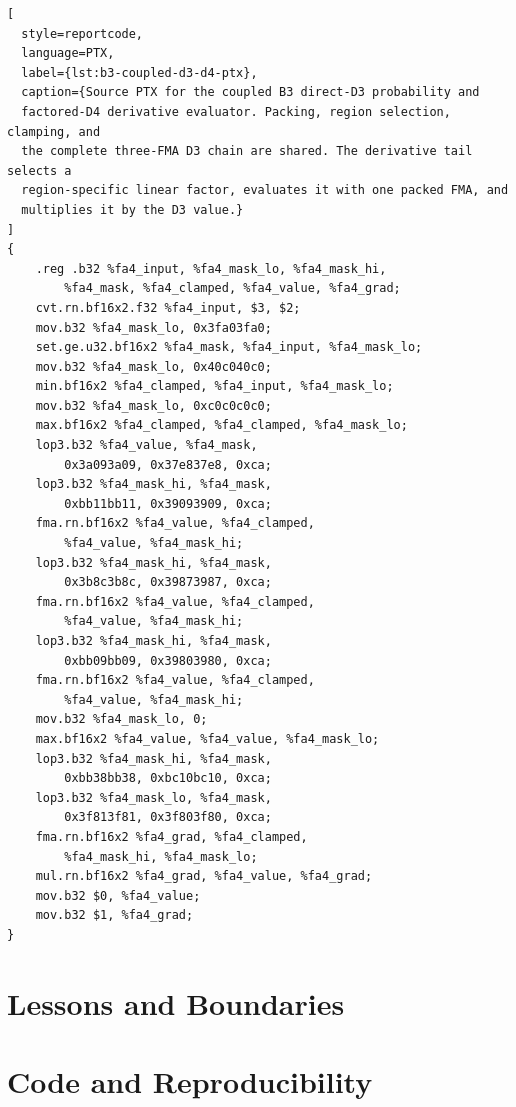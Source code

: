 \documentclass[11pt]{article}
\begin{document}
\begin{lstlisting}[
  style=reportcode,
  language=PTX,
  label={lst:b3-coupled-d3-d4-ptx},
  caption={Source PTX for the coupled B3 direct-D3 probability and
  factored-D4 derivative evaluator. Packing, region selection, clamping, and
  the complete three-FMA D3 chain are shared. The derivative tail selects a
  region-specific linear factor, evaluates it with one packed FMA, and
  multiplies it by the D3 value.}
]
{
    .reg .b32 %fa4_input, %fa4_mask_lo, %fa4_mask_hi,
        %fa4_mask, %fa4_clamped, %fa4_value, %fa4_grad;
    cvt.rn.bf16x2.f32 %fa4_input, $3, $2;
    mov.b32 %fa4_mask_lo, 0x3fa03fa0;
    set.ge.u32.bf16x2 %fa4_mask, %fa4_input, %fa4_mask_lo;
    mov.b32 %fa4_mask_lo, 0x40c040c0;
    min.bf16x2 %fa4_clamped, %fa4_input, %fa4_mask_lo;
    mov.b32 %fa4_mask_lo, 0xc0c0c0c0;
    max.bf16x2 %fa4_clamped, %fa4_clamped, %fa4_mask_lo;
    lop3.b32 %fa4_value, %fa4_mask,
        0x3a093a09, 0x37e837e8, 0xca;
    lop3.b32 %fa4_mask_hi, %fa4_mask,
        0xbb11bb11, 0x39093909, 0xca;
    fma.rn.bf16x2 %fa4_value, %fa4_clamped,
        %fa4_value, %fa4_mask_hi;
    lop3.b32 %fa4_mask_hi, %fa4_mask,
        0x3b8c3b8c, 0x39873987, 0xca;
    fma.rn.bf16x2 %fa4_value, %fa4_clamped,
        %fa4_value, %fa4_mask_hi;
    lop3.b32 %fa4_mask_hi, %fa4_mask,
        0xbb09bb09, 0x39803980, 0xca;
    fma.rn.bf16x2 %fa4_value, %fa4_clamped,
        %fa4_value, %fa4_mask_hi;
    mov.b32 %fa4_mask_lo, 0;
    max.bf16x2 %fa4_value, %fa4_value, %fa4_mask_lo;
    lop3.b32 %fa4_mask_hi, %fa4_mask,
        0xbb38bb38, 0xbc10bc10, 0xca;
    lop3.b32 %fa4_mask_lo, %fa4_mask,
        0x3f813f81, 0x3f803f80, 0xca;
    fma.rn.bf16x2 %fa4_grad, %fa4_clamped,
        %fa4_mask_hi, %fa4_mask_lo;
    mul.rn.bf16x2 %fa4_grad, %fa4_value, %fa4_grad;
    mov.b32 $0, %fa4_value;
    mov.b32 $1, %fa4_grad;
}
\end{lstlisting}

\FloatBarrier

\section{Lessons and Boundaries}
\label{app:lessons-and-boundaries}



\section{Code and Reproducibility}
\label{app:reproducibility}

\begingroup
\scriptsize

\endgroup
\end{document}
